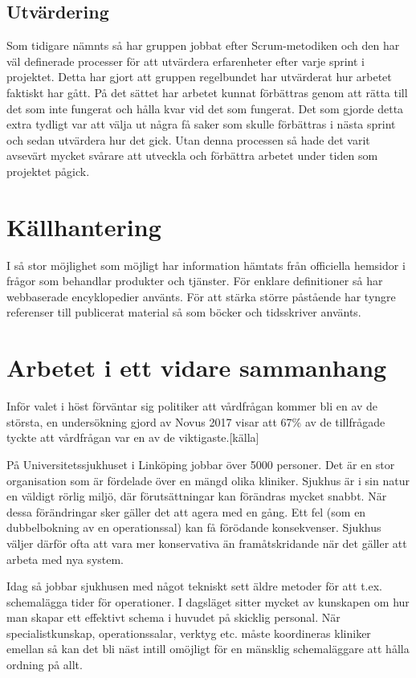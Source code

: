 \subsection{Utvärdering}
Som tidigare nämnts så har gruppen jobbat efter Scrum-metodiken och den har väl definerade processer för att utvärdera erfarenheter efter varje sprint i projektet. Detta har gjort att gruppen regelbundet har utvärderat hur arbetet faktiskt har gått. På det sättet har arbetet kunnat förbättras genom att rätta till det som inte fungerat och hålla kvar vid det som fungerat. Det som gjorde detta extra tydligt var att välja ut några få saker som skulle förbättras i nästa sprint och sedan utvärdera hur det gick. Utan denna processen så hade det varit avsevärt mycket svårare att utveckla och förbättra arbetet under tiden som projektet pågick.

\section{Källhantering}
I så stor möjlighet som möjligt har information hämtats från officiella hemsidor i frågor som behandlar produkter och tjänster. För enklare definitioner så har webbaserade encyklopedier använts. För att stärka större påstående har tyngre referenser till publicerat material så som böcker och tidsskriver använts.

\section{Arbetet i ett vidare sammanhang}

Inför valet i höst förväntar sig politiker att vårdfrågan kommer bli en av de största, en undersökning gjord av Novus 2017 visar att 67\% av de tillfrågade tyckte att vårdfrågan var en av de viktigaste.[källa]

På Universitetssjukhuset i Linköping jobbar över 5000 personer. Det är en stor organisation som är fördelade över en mängd olika kliniker. Sjukhus är i sin natur en väldigt rörlig miljö, där förutsättningar kan förändras mycket snabbt. När dessa förändringar sker gäller det att agera med en gång. Ett fel (som en dubbelbokning av en operationssal) kan få förödande konsekvenser. Sjukhus väljer därför ofta att vara mer konservativa än framåtskridande när det gäller att arbeta med nya system.

Idag så jobbar sjukhusen med något tekniskt sett äldre metoder för att t.ex. schemalägga tider för operationer. I dagsläget sitter mycket av kunskapen om hur man skapar ett effektivt schema i huvudet på skicklig personal. När specialistkunskap, operationssalar, verktyg etc. måste koordineras kliniker emellan så kan det bli näst intill omöjligt för en mänsklig schemaläggare att hålla ordning på allt.


